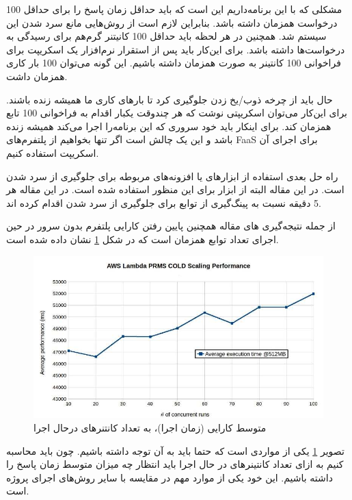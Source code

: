 مشکلی که با این برنامه‌داریم این است که باید حداقل زمان پاسخ را برای حداقل 100 درخواست همزمان داشته باشد. بنابراین لازم است از روش‌هایی مانع سرد شدن این سیستم شد. همچنین در هر لحظه باید حداقل 100 کانیتنر گرم‌هم برای رسیدگی به درخواست‌ها داشته باشد. برای این‌کار باید پس از استقرار نرم‌افزار یک اسکریپت برای فراخوانی 100 کانتینر به صورت همزمان داشته باشیم. این گونه می‌توان 100 بار کاری همزمان داشت.

حال باید از چرخه ذوب/یخ زدن جلوگیری کرد تا بارهای کاری ما همیشه زنده باشند. برای این‌کار می‌توان اسکریپتی نوشت که هر چند‌وقت یکبار اقدام به فراخوانی 100 تابع همزمان کند. برای اینکار باید خود سروری که این برنامه‌را اجرا می‌کند همیشه زنده باشد و این یک چالش است اگر تنها بخواهیم از پلتفرم‌های FaaS برای اجرای آن اسکریپت استفاده کنیم. 

راه حل بعدی استفاده از ابزار‌های یا افزونه‌های مربوطه برای جلوگیری از سرد شدن است. در این مقاله البته از ابزار  برای این منظور استفاده شده است. در این مقاله هر 5 دقیقه نسبت به پینگ‌گیری از توابع برای جلوگیری از سرد شدن اقدام کرده اند. 

از جمله نتیجه‌گیری های مقاله همچنین پایین رفتن کارایی پلتفرم بدون سرور در حین اجرای تعداد توابع همزمان است که در شکل \ref{fig:Serverless-AveragePerformace-PerNumberOfFunctions} نشان داده شده است. 

\begin{figure}
	\centering
	\includegraphics[width=0.8\linewidth]{figs/Serverless-AveragePerformace-PerNumberOfFunctions}
	\caption {متوسط کارایی (زمان اجرا)، به تعداد کانتنر‌های درحال اجرا}
	\label{fig:Serverless-AveragePerformace-PerNumberOfFunctions}
\end{figure}

تصویر \ref{fig:Serverless-AveragePerformace-PerNumberOfFunctions} یکی از مواردی است که حتما باید به آن توجه داشته باشیم. چون باید محاسبه کنیم به ازای تعداد کانتینر‌های در حال اجرا باید انتظار چه میزان متوسط زمان پاسخ را داشته باشیم. این خود یکی از موارد مهم در مقایسه با سایر روش‌های اجرای پروژه است. 

